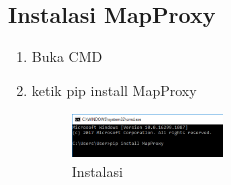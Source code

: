 \subsection{Instalasi MapProxy}
\begin{enumerate}
  \item Buka CMD
  \item ketik pip install MapProxy
  \hfill\break
  \begin{figure}[H]
  \includegraphics[width=4cm]{figures/tugas4/1174091/7.png}
  \centering
  \caption{Instalasi}
  \end{figure}
\end{enumerate}

